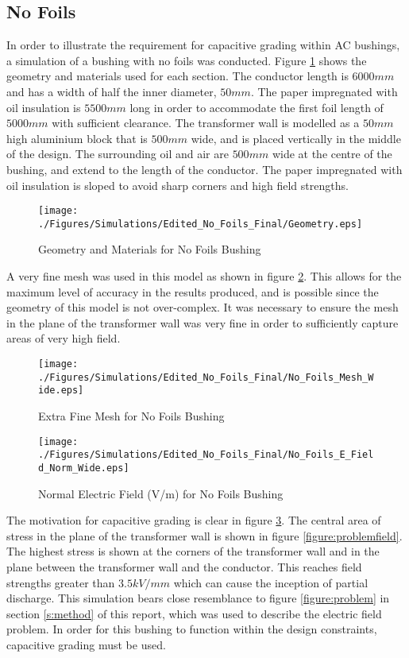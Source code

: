 \subsection{No Foils}
In order to illustrate the requirement for capacitive grading within AC bushings, a simulation of a bushing with no foils was conducted.
Figure \ref{Figure:No_Foil_Geom} shows the geometry and materials used for each section.
The conductor length is $6000mm$ and has a width of half the inner diameter, $50mm$. 
The paper impregnated with oil insulation is $5500mm$ long in order to accommodate the first foil length of $5000mm$ with sufficient clearance. 
The transformer wall is modelled as a $50mm$ high aluminium block that is $500mm$ wide, and is placed vertically in the middle of the design. The surrounding oil and air are $500mm$ wide at the centre of the bushing, and extend to the length of the conductor.
The paper impregnated with oil insulation is sloped to avoid sharp corners and high field strengths.
\begin{figure}[!h]
  \centering
    \texttt{[image: ./Figures/Simulations/Edited\_No\_Foils\_Final/Geometry.eps]} 
	\caption{Geometry and Materials for No Foils Bushing}
\label{Figure:No_Foil_Geom}
\end{figure}


A very fine mesh was used in this model as shown in figure \ref{Figure:No_Foil_Mesh}. This allows for the maximum level of accuracy in the results produced, and is possible since the geometry of this model is not over-complex. It was necessary to ensure the mesh in the plane of the transformer wall was very fine in order to sufficiently capture areas of very high field.
\begin{figure}[!h]
  \centering
    \texttt{[image: ./Figures/Simulations/Edited\_No\_Foils\_Final/No\_Foils\_Mesh\_Wide.eps]} 
	\caption{Extra Fine Mesh for No Foils Bushing}
\label{Figure:No_Foil_Mesh}
\end{figure}


\begin{figure}[!h]
  \centering
    \texttt{[image: ./Figures/Simulations/Edited\_No\_Foils\_Final/No\_Foils\_E\_Field\_Norm\_Wide.eps]} 
	\caption{Normal Electric Field (V/m) for No Foils Bushing}
\label{Figure:No_Foil_Field}
\end{figure}


The motivation for capacitive grading is clear in figure \ref{Figure:No_Foil_Field}. 
The central area of stress in the plane of the transformer wall is shown in figure \ref{figure:problemfield}.
The highest stress is shown at the corners of the transformer wall and in the plane between the transformer wall and the conductor.
This reaches field strengths greater than $3.5kV/mm$ which can cause the inception of partial discharge.
This simulation bears close resemblance to figure \ref{figure:problem} in section \ref{s:method} of this report, which was used to describe the electric field problem.
In order for this bushing to function within the design constraints, capacitive grading must be used.

